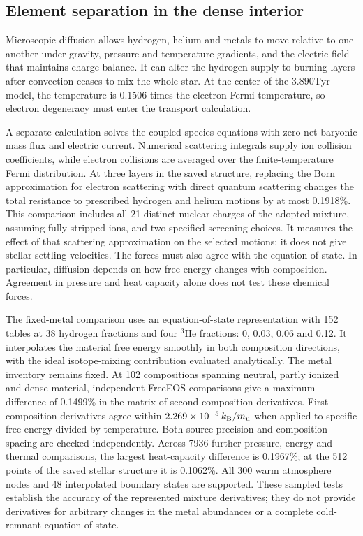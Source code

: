 \documentclass[11pt,letterpaper]{article}
\newcommand{\Tyr}{\mathrm{Tyr}}
\begin{document}
\subsection{Element separation in the dense interior}
Microscopic diffusion allows hydrogen, helium and metals to move relative to
one another under gravity, pressure and temperature gradients, and the
electric field that maintains charge balance. It can alter the hydrogen
supply to burning layers after convection ceases to mix the whole star.
At the center of the $3.890\Tyr$ model, the temperature is 0.1506 times
the electron Fermi temperature, so electron degeneracy must enter the
transport calculation.

A separate calculation solves the coupled species equations with zero net
baryonic mass flux and electric current. Numerical scattering integrals
supply ion collision coefficients, while electron collisions are averaged
over the finite-temperature Fermi distribution. At three layers in the
saved structure, replacing the Born approximation for electron scattering
with direct quantum scattering changes the total resistance to prescribed
hydrogen and helium motions by at most 0.1918\%. This comparison includes
all 21 distinct nuclear charges of the adopted mixture, assuming fully
stripped ions, and two specified screening choices. It measures the effect
of that scattering approximation on the selected motions; it does not give
stellar settling velocities. The forces must also agree with the equation
of state. In particular, diffusion depends on how free energy changes with
composition. Agreement in pressure and heat capacity alone does not test
these chemical forces.

The fixed-metal comparison uses an equation-of-state representation with 152 tables
at 38 hydrogen fractions and four $^3$He fractions: 0, 0.03, 0.06 and 0.12.
It interpolates the material free energy smoothly in both composition
directions, with the ideal isotope-mixing contribution evaluated analytically.
The metal inventory remains fixed. At 102 compositions spanning neutral,
partly ionized and dense material, independent FreeEOS comparisons give a
maximum difference of 0.1499\% in the matrix of second composition
derivatives. First composition derivatives agree within
$2.269\times10^{-5}\,k_{\rm B}/m_{\rm u}$ when applied to specific free energy
divided by temperature. Both source precision and composition spacing are
checked independently. Across 7936 further pressure, energy and thermal
comparisons, the largest heat-capacity difference is 0.1967\%; at the 512
points of the saved stellar structure it is 0.1062\%. All 300 warm atmosphere
nodes and 48 interpolated boundary states are supported. These sampled tests
establish the accuracy of the represented mixture derivatives; they do not
provide derivatives for arbitrary changes in the metal abundances or a
complete cold-remnant equation of state.
\end{document}
